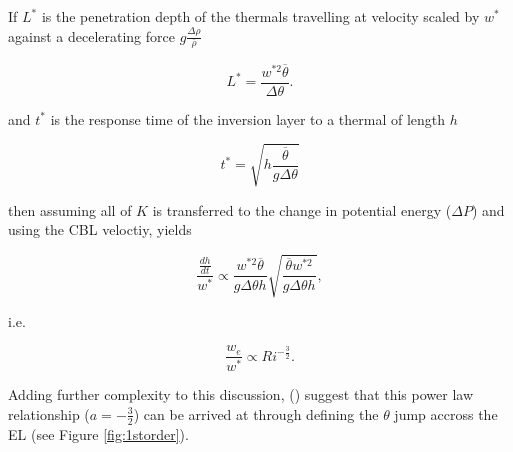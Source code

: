 If $L^{*}$ is the penetration depth of the thermals travelling at velocity scaled by $w^{*}$ against a decelerating force
$g \frac{\Delta \rho}{\overline{\rho}}$

\begin{equation}
L^{*} = \frac{w^{*2} \overline{\theta}}{\Delta \theta}.  
\end{equation}

and $t^{*}$ is the response time of the inversion layer to a thermal of length $h$

\begin{equation}
t^{*} = \sqrt{h \frac{\overline{\theta}}{g \Delta \theta}}  
\end{equation}

then assuming all of $K$ is transferred to the change in potential energy ($\Delta P$) and using the \acs{CBL} veloctiy, yields




\begin{equation}
\frac{\frac{dh}{dt}}{w^{*}} \propto \frac{w^{*2} \overline{\theta}}{g \Delta \theta h} \sqrt{\frac{\overline{\theta} w^{*2}}{g \Delta \theta h}},
\end{equation}

i.e.

\begin{equation}
\frac{w_{e}}{w^{*}} \propto Ri^{-\frac{3}{2}}.
\end{equation}

Adding further complexity to this discussion, \citeauthor{FedConzMir04} (\citeyear{FedConzMir04}) suggest that this power law relationship ($a = -\frac{3}{2}$) can be arrived at through defining the $\theta$ jump accross the \acs{EL} (see Figure \ref{fig:1storder}).\\

